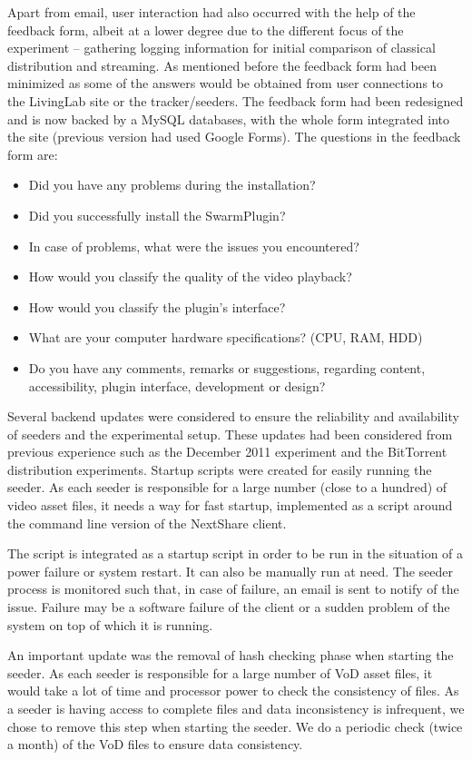 Apart from email, user interaction had also occurred with the help of the
feedback form, albeit at a lower degree due to the different focus of the
experiment -- gathering logging information for initial comparison of classical
distribution and streaming. As mentioned before the feedback form had been
minimized as some of the answers would be obtained from user connections to
the LivingLab site or the tracker/seeders. The feedback form had been
redesigned and is now backed by a MySQL databases, with the whole form
integrated into the site (previous version had used Google Forms). The
questions in the feedback form are:

\begin{itemize}
  \item Did you have any problems during the installation?
  \item Did you successfully install the SwarmPlugin?
  \item In case of problems, what were the issues you encountered?
  \item How would you classify the quality of the video playback?
  \item How would you classify the plugin's interface?
  \item What are your computer hardware specifications? (CPU, RAM, HDD)
  \item Do you have any comments, remarks or suggestions, regarding content,
  accessibility, plugin interface, development or design?
\end{itemize}

Several backend updates were considered to ensure the reliability and
availability of seeders and the experimental setup. These updates had been
considered from previous experience such as the December 2011 experiment and
the BitTorrent distribution experiments. Startup scripts were created for
easily running the seeder. As each seeder is responsible for a large number
(close to a hundred) of video asset files, it needs a way for fast startup,
implemented as a script around the command line version of the NextShare
client.

The script is integrated as a startup script in order to be run in the
situation of a power failure or system restart. It can also be manually run at
need. The seeder process is monitored such that, in case of failure, an email
is sent to notify of the issue. Failure may be a software failure of the
client or a sudden problem of the system on top of which it is running.

An important update was the removal of hash checking phase when starting the
seeder. As each seeder is responsible for a large number of VoD asset files,
it would take a lot of time and processor power to check the consistency of
files. As a seeder is having access to complete files and data inconsistency
is infrequent, we chose to remove this step when starting the seeder. We do a
periodic check (twice a month) of the VoD files to ensure data consistency.

